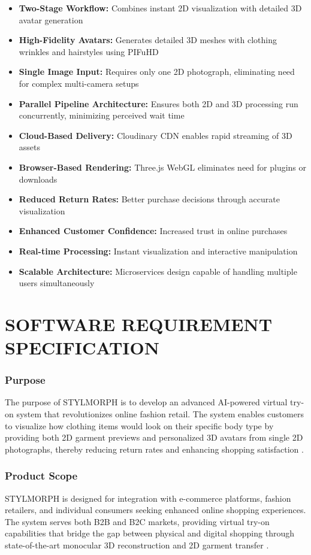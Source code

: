 \documentclass[12pt,a4paper,oneside]{report}
\begin{document}
\begin{itemize}
    \item \textbf{Two-Stage Workflow:} Combines instant 2D visualization with detailed 3D avatar generation
    \item \textbf{High-Fidelity Avatars:} Generates detailed 3D meshes with clothing wrinkles and hairstyles using PIFuHD \cite{1}
    \item \textbf{Single Image Input:} Requires only one 2D photograph, eliminating need for complex multi-camera setups \cite{9, 10}
    \item \textbf{Parallel Pipeline Architecture:} Ensures both 2D and 3D processing run concurrently, minimizing perceived wait time
    \item \textbf{Cloud-Based Delivery:} Cloudinary CDN enables rapid streaming of 3D assets
    \item \textbf{Browser-Based Rendering:} Three.js WebGL eliminates need for plugins or downloads \cite{6}
    \item \textbf{Reduced Return Rates:} Better purchase decisions through accurate visualization \cite{5}
    \item \textbf{Enhanced Customer Confidence:} Increased trust in online purchases
    \item \textbf{Real-time Processing:} Instant visualization and interactive manipulation
    \item \textbf{Scalable Architecture:} Microservices design capable of handling multiple users simultaneously \cite{19}
\end{itemize}

\chapter{SOFTWARE REQUIREMENT SPECIFICATION}

\subsection{Purpose}
The purpose of STYLMORPH is to develop an advanced AI-powered virtual try-on system that revolutionizes online fashion retail. The system enables customers to visualize how clothing items would look on their specific body type by providing both 2D garment previews and personalized 3D avatars from single 2D photographs, thereby reducing return rates and enhancing shopping satisfaction \cite{5}.

\subsection{Product Scope}
STYLMORPH is designed for integration with e-commerce platforms, fashion retailers, and individual consumers seeking enhanced online shopping experiences. The system serves both B2B and B2C markets, providing virtual try-on capabilities that bridge the gap between physical and digital shopping through state-of-the-art monocular 3D reconstruction \cite{1} and 2D garment transfer \cite{16}.
\end{document}
